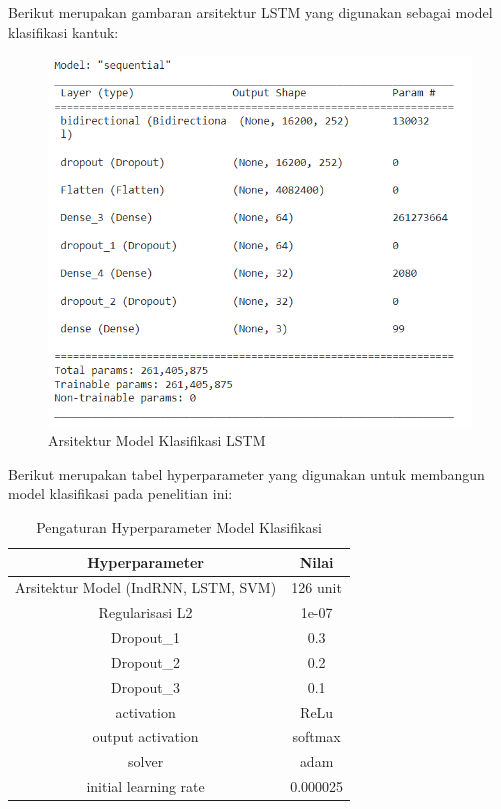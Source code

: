 Berikut merupakan gambaran arsitektur LSTM yang digunakan sebagai model
klasifikasi kantuk:
\begin{figure} [ht] \centering
      \includegraphics[scale=0.7]{gambar/arsitekturLSTM.png}
      \caption{Arsitektur Model Klasifikasi LSTM}
      \label{fig:arsitekturLSTM}
\end{figure}

\newpage
Berikut merupakan tabel hyperparameter yang digunakan untuk membangun model klasifikasi pada penelitian ini:

\begin{longtable}{|c|c|}
      \caption{Pengaturan Hyperparameter Model Klasifikasi}
      \label{tb:Hyperparameter}                             \\
      \hline
      \rowcolor[HTML]{C0C0C0}
      \textbf{Hyperparameter}              & \textbf{Nilai} \\
      \hline
      Arsitektur Model (IndRNN, LSTM, SVM) & 126 unit       \\
      Regularisasi L2                      & 1e-07          \\
      Dropout\_1                           & 0.3            \\
      Dropout\_2                           & 0.2            \\
      Dropout\_3                           & 0.1            \\
      activation                           & ReLu           \\
      output activation                    & softmax        \\
      solver                               & adam           \\
      initial learning rate                & 0.000025       \\
      \hline
\end{longtable}

